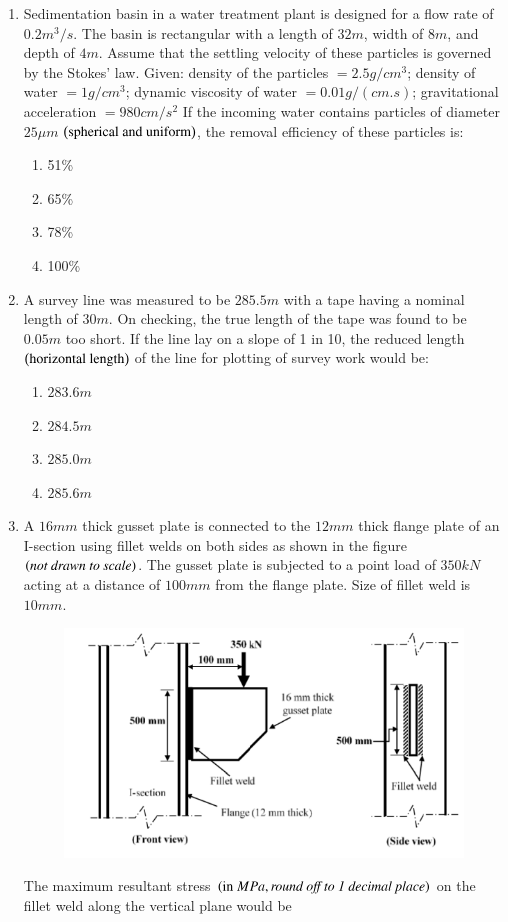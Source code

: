 \documentclass[journal,12pt,onecolumn]{IEEEtran}
\theoremstyle{remark}
\begin{document}
\begin{enumerate}
\item Sedimentation basin in a water treatment plant is designed for a flow rate of $0.2m^3/s$. The basin is rectangular with a length of $32m$, width of $8m$, and depth of $4m$. Assume that the settling velocity of these particles is governed by the Stokes' law. Given: density of the particles $=2.5g/cm^3$; density of water $=1g/cm^3$; dynamic viscosity of water $=0.01g/(cm.s)$; gravitational acceleration $=980cm/s^2$ If the incoming water contains particles of diameter $25\mu m$ $\left(\text{spherical and uniform}\right)$, the removal efficiency of these particles is:

\hfill{}
\begin{enumerate}
\item 51\%
\item 65\%
\item 78\%
\item 100\%
\end{enumerate}

\item A survey line was measured to be $285.5m$ with a tape having a nominal length of $30m$. On checking, the true length of the tape was found to be $0.05m$ too short. If the line lay on a slope of 1 in 10, the reduced length $\left(\text{horizontal length}\right)$ of the line for plotting of survey work would be:

\hfill{}
\begin{enumerate}
\item $283.6m$
\item $284.5m$
\item $285.0m$
\item $285.6m$
\end{enumerate}

\item A $16mm$ thick gusset plate is connected to the $12mm$ thick flange plate of an I-section using fillet welds on both sides as shown in the figure $\left(\textit{not drawn to scale}\right)$. The gusset plate is subjected to a point load of $350kN$ acting at a distance of $100mm$ from the flange plate. Size of fillet weld is $10mm$.

\begin{figure}[H]
\centering
\includegraphics[width=0.5\columnwidth]{figs/q36.png}
\caption*{}
\label{fig:Q.36}
\end{figure}
The maximum resultant stress $\left(\text{in }MPa,\textit{round off to 1 decimal place}\right)$ on the fillet weld along the vertical plane would be \underline{\hspace{2cm}}


\end{enumerate}
\end{document}
